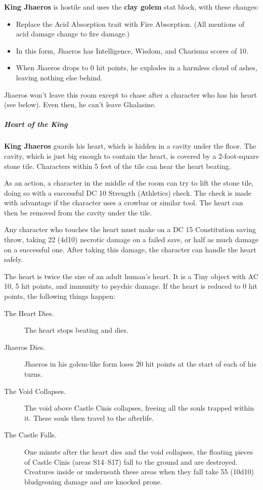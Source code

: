 \documentclass[10pt,a4paper,twoside,bg=print,twocolumn,openany,nodeprecatedcode]{dndbook}
\begin{document}
\textbf{King Jhaeros} is hostile and uses the \textbf{clay golem} stat block, with these changes:


\begin{itemize}
\item Replace the Acid Absorption trait with Fire Absorption. (All mentions of acid damage change to fire damage.)
\item In this form, Jhaeros has Intelligence, Wisdom, and Charisma scores of 10.
\item When Jhaeros drops to 0 hit points, he explodes in a harmless cloud of ashes, leaving nothing else behind.
\end{itemize}

Jhaeros won't leave this room except to chase after a character who has his heart (see below). Even then, he can't leave Ghalasine.

\subparagraph{Heart of the King}
\textbf{King Jhaeros} guards his heart, which is hidden in a cavity under the floor. The cavity, which is just big enough to contain the heart, is covered by a 2-foot-square stone tile. Characters within 5 feet of the tile can hear the heart beating.

As an action, a character in the middle of the room can try to lift the stone tile, doing so with a successful DC 10 Strength (Athletics) check. The check is made with advantage if the character uses a crowbar or similar tool. The heart can then be removed from the cavity under the tile.

Any character who touches the heart must make on a DC 15 Constitution saving throw, taking 22 (4d10) necrotic damage on a failed save, or half as much damage on a successful one. After taking this damage, the character can handle the heart safely.

The heart is twice the size of an adult human's heart. It is a Tiny object with AC 10, 5 hit points, and immunity to psychic damage. If the heart is reduced to 0 hit points, the following things happen:


\begin{description}
\item[The Heart Dies.]
The heart stops beating and dies.
\item[Jhaeros Dies.]
Jhaeros in his golem-like form loses 20 hit points at the start of each of his turns.
\item[The Void Collapses.]
The void above Castle Cinis collapses, freeing all the souls trapped within it. These souls then travel to the afterlife.
\item[The Castle Falls.]
One minute after the heart dies and the void collapses, the floating pieces of Castle Cinis (areas S14–S17) fall to the ground and are destroyed. Creatures inside or underneath these areas when they fall take 55 (10d10) bludgeoning damage and are knocked prone.
\end{description}
\end{document}
